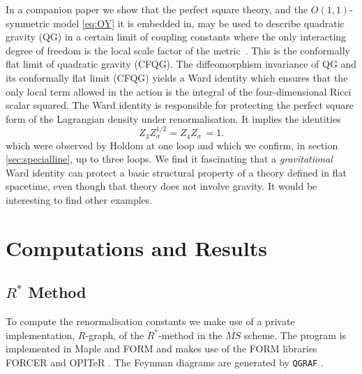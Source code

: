 \documentclass[a4paper,11pt]{article}
\begin{document}
In a companion paper we show that the perfect square theory, and the $O(1,1)$-symmetric model \cref{eq:OY} it is embedded in, may be used to describe quadratic gravity (QG) in a certain limit of coupling constants where the only interacting degree of freedom is the local scale factor of the metric~\cite{Anderson:2026Rsqaured}. This is the conformally flat limit of quadratic gravity (CFQG). The diffeomorphism invariance of QG and its conformally flat limit (CFQG) yields a Ward identity which ensures that the only local term allowed in the action is the integral of the four-dimensional Ricci scalar squared. The Ward identity is responsible for protecting the perfect square form of the Lagrangian density under renormalisation. It implies the identities 
   \begin{equation}\label{eq:Warditentity}
    Z_3Z_\sigma^{1/2} = Z_4 Z_\sigma\,=1.
\end{equation}
which were observed by Holdom at one loop \cite{Holdom:2023usn} and which  we confirm, in section \ref{sec:specialline}, up to three loops. We find it fascinating that a {\it gravitational} Ward identity can protect a basic structural property of a theory defined in flat spacetime, even though that theory does not involve gravity. It would be interesting to find other examples. 

\section{Computations and Results}
\label{sec:ComputationsandResults}
\subsection{\texorpdfstring{$R^*$}{R*} Method} To compute the renormalisation constants  we make use of a private implementation, $R$-graph, of the $R^*$-method 
\cite{Chetyrkin:1982nn,Vladimirov:1979zm,
Chetyrkin:1984xa,Smirnov:1985yck,Larin:2002sc,Kleinert:2001hn,Chetyrkin:2017ppe,Herzog:2017bjx,deVries:2019nsu,Beekveldt:2020kzk,Henriksson:2025hwi} in the $\overline{MS}$ scheme. The program is implemented in Maple \cite{maple} and FORM \cite{Kuipers:2012rf,Vermaseren:2000nd,Ruijl:2017dtg} and makes use of the FORM libraries FORCER \cite{Ruijl:2017cxj} and OPITeR \cite{Goode:2024cfy}. The Feynman diagrams are generated by \texttt{QGRAF} \cite{Nogueira:1991ex}. 
\end{document}
